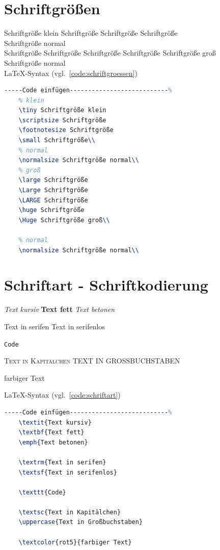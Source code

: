 \clearpage
\section{Schriftgrößen}

\tiny Schriftgröße klein
\scriptsize Schriftgröße 
\footnotesize Schriftgröße
\small Schriftgröße\\
\normalsize Schriftgröße normal\\
\large Schriftgröße
\Large Schriftgröße
\LARGE Schriftgröße
\huge Schriftgröße
\Huge Schriftgröße groß\\

\normalsize Schriftgröße normal\\

\LaTeX -Syntax (vgl.~\ref{code:schriftgroessen})

\begin{lstlisting}[language=TeX,% C, TeX, Bash, Python
caption={Schriftgrößen},label={code:schriftgroessen}%
]-----Code einfügen---------------------------%
	% klein
	\tiny Schriftgröße klein
	\scriptsize Schriftgröße 
	\footnotesize Schriftgröße
	\small Schriftgröße\\
	% normal
	\normalsize Schriftgröße normal\\
	% groß
	\large Schriftgröße
	\Large Schriftgröße
	\LARGE Schriftgröße
	\huge Schriftgröße
	\Huge Schriftgröße groß\\
	
	% normal
	\normalsize Schriftgröße normal\\
\end{lstlisting}

\clearpage
\section{Schriftart - Schriftkodierung}

\textit{Text kursiv}
\textbf{Text fett}
\emph{Text betonen}

\textrm{Text in serifen}
\textsf{Text in serifenlos}

\texttt{Code}

\textsc{Text in Kapitälchen} 
\uppercase{Text in Großbuchstaben}

\textcolor{rot5}{farbiger Text}

\LaTeX -Syntax (vgl.~\ref{code:schriftart})

\begin{lstlisting}[language=TeX,% C, TeX, Bash, Python
caption={Schriftart},label={code:schriftart}%
]-----Code einfügen---------------------------%
	\textit{Text kursiv}
	\textbf{Text fett}
	\emph{Text betonen}
	
	\textrm{Text in serifen}
	\textsf{Text in serifenlos}
	
	\texttt{Code}
	
	\textsc{Text in Kapitälchen} 
	\uppercase{Text in Großbuchstaben}
	
	\textcolor{rot5}{farbiger Text}
\end{lstlisting}